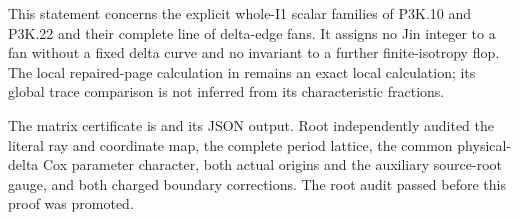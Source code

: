 This statement concerns the explicit whole-I1 scalar families
of P3K.10 and P3K.22 and their complete line of delta-edge fans.
It assigns no Jin integer to a fan without a fixed delta curve
and no invariant to a further finite-isotropy flop. The local
repaired-page calculation in
 remains an exact local
calculation; its global trace comparison is not inferred from
its characteristic fractions.

The matrix certificate is
 and its JSON output.
Root independently audited the literal ray and coordinate map,
the complete period lattice, the common physical-delta Cox
parameter character, both actual origins and the auxiliary
source-root gauge, and both charged boundary corrections.
The root audit passed before this proof was promoted.
